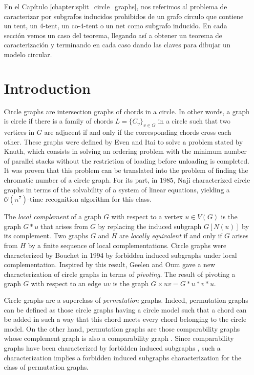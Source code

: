 \documentclass[12pt]{book}
\theoremstyle{plain}
\theoremstyle{remark}
\begin{document}
En el Capítulo \ref{chapter:split_circle_graphs}, nos referimos al problema de caracterizar por subgrafos inducidos prohibidos de un grafo círculo que contiene un tent, un $4$-tent, un co-$4$-tent o un net como subgrafo inducido. En cada sección vemos un caso del teorema, llegando así a obtener un teorema de caracterización y terminando en cada caso dando las claves para dibujar un modelo circular.




%
\chapter{Introduction}


Circle graphs \cite{EI71} are intersection graphs of chords in
a circle. In other words, a graph is circle if there is a family of chords $L= \{ C_v \}_{v\in G}$ in a circle such that two vertices in $G$ are adjacent if and only if the corresponding chords cross each other. 
These graphs were defined by Even and Itai \cite{EI71} to solve a problem stated by Knuth, which consists in solving an ordering problem with the minimum number of parallel stacks without the restriction of loading before unloading is completed. It was proven that this problem can be translated into the problem of finding the chromatic number of a circle graph. 
For its part, in 1985, Naji \cite{N85} characterized circle graphs in terms of the solvability of a system of linear equations, yielding a $\mathcal{O}(n^7)$-time recognition algorithm for this class.

The \emph{local complement }of a graph $G$ with respect to a vertex $u \in V(G)$ is the graph $G*u$ that arises from $G$ by replacing the induced subgraph $G\left[N(u)\right]$ by its complement. Two graphs $G$ and $H$ are \emph{locally equivalent} if and only if $G$ arises from $H$ by a finite sequence of local complementations. Circle graphs were characterized by Bouchet \cite{B94} in 1994 by forbidden induced subgraphs under local complementation. Inspired by this result, Geelen and Oum \cite{GO09} gave a new characterization of circle graphs in terms of \emph{pivoting}. The result of pivoting a graph $G$ with respect to an edge $uv$ is the graph $G \times uv = G * u * v * u$. %

Circle graphs are a superclass of \emph{permutation} graphs. Indeed, permutation graphs can be defined as those circle graphs having a circle model such that a chord can be added in such a way that this chord meets every chord belonging to the circle model. On the other hand, permutation graphs are those comparability graphs whose complement graph is also a comparability graph \cite{EPL72}. Since comparability graphs have been characterized by forbidden induced subgraphs \cite{G67}, such a characterization implies a forbidden induced subgraphs characterization for the class of permutation graphs.
\end{document}
